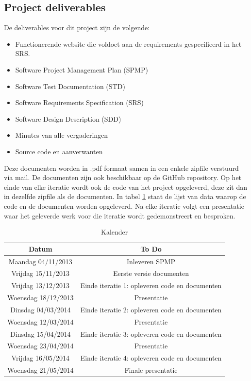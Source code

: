 \subsection{Project deliverables}
De deliverables voor dit project zijn de volgende:
\begin{itemize}
	\item Functionerende website die voldoet aan de requirements gespecifieerd in het SRS.
	\item Software Project Management Plan (SPMP)
	\item Software Test Documentation (STD)
	\item Software Requirements Specification (SRS)
	\item Software Design Description (SDD)
	\item Minutes van alle vergaderingen
	\item Source code en aanverwanten
\end{itemize}
Deze documenten worden in .pdf formaat samen in een enkele zipfile verstuurd via mail. De documenten zijn ook beschikbaar op de GitHub repository. Op het einde van elke iteratie wordt ook de code van het project opgeleverd, deze zit dan in dezelfde zipfile als de documenten. In tabel \ref{tab:kalender} staat de lijst van data waarop de code en de documenten worden opgeleverd. Na elke iteratie volgt een presentatie waar het geleverde werk voor die iteratie wordt gedemonstreert en besproken. 
\begin{table}[H]
  \centering
  \caption{Kalender}
    \begin{tabular}{c|c}
    \textbf{Datum} & \textbf{To Do} \\
    \hline
    Maandag 04/11/2013 & Inleveren SPMP \\
    Vrijdag 15/11/2013 & Eerste versie documenten \\
    Vrijdag 13/12/2013 & Einde iteratie 1: opleveren code en documenten \\
    Woensdag 18/12/2013 & Presentatie \\
    \hline
    \hline
    Dinsdag 04/03/2014 & Einde iteratie 2: opleveren code en documenten \\
    Woensdag 12/03/2014 & Presentatie \\
    Dinsdag 15/04/2014 & Einde iteratie 3: opleveren code en documenten \\
    Woensdag 23/04/2014 & Presentatie \\
    Vrijdag 16/05/2014 & Einde iteratie 4: opleveren code en documenten \\
    Woensdag 21/05/2014 & Finale presentatie \\
    \end{tabular}
  \label{tab:kalender}
\end{table}

